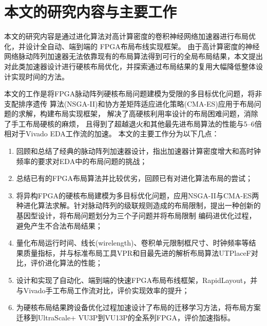 \section{本文的研究内容与主要工作}

本文的研究内容是通过进化算法对高计算密度的卷积神经网络加速器进行布局优化，并设计全自动、端到端的
FPGA布局布线实现框架。
由于高计算密度的神经网络脉动阵列加速器无法依靠现有的布局算法得到可行的全局布局结果，本文提出
对此类加速器设计进行硬核布局优化，并探索通过布局结果的复用大幅降低整体设计实现时间的方法。

本文的工作是将FPGA脉动阵列硬核布局问题建模为受限的多目标优化问题，将非支配排序遗传
算法(NSGA-II)和协方差矩阵适应进化策略(CMA-ES)应用于布局问题的求解，构建布局实现框架，
解决了高硬核利用率设计的布局困难问题，消除了手工布局硬核的麻烦，
且得到了超越退火和其他最先进布局算法的性能与5--6倍相对于Vivado EDA工作流的加速。
本文的主要工作分为以下几点：

\begin{enumerate}
    \item 回顾和总结了经典的脉动阵列加速器设计，指出加速器计算密度增大和高时钟频率的要求对EDA中的布局问题的挑战；
    \item 总结已有的FPGA布局算法并比较优劣，回顾已有对进化算法布局的尝试；
    \item 将异构FPGA的硬核布局建模为多目标优化问题，应用NSGA-II与CMA-ES两种进化算法求解。针对脉动阵列的级联规则造成的布局限制，提出一种创新的基因型设计，将布局问题划分为三个子问题并将布局限制
    编码进优化过程，避免产生不合法布局结果；    
    \item 量化布局运行时间、线长(wirelength)、卷积单元限制框尺寸、时钟频率等结果质量指标，并与标准布局工具VPR和目最先进的解析布局算法UTPlaceF对比，评价进化算法的性能；
    \item 设计和实现了自动化、端到端的快速FPGA布局布线框架，RapidLayout，并与Vivado手工布局工作流对比，评价实现效率的提升；
    \item 为硬核布局结果跨设备优化过程加速设计了布局的迁移学习方法，将布局方案迁移到UltraScale+ VU3P到VU13P的全系列FPGA，评价加速指标。
\end{enumerate}




